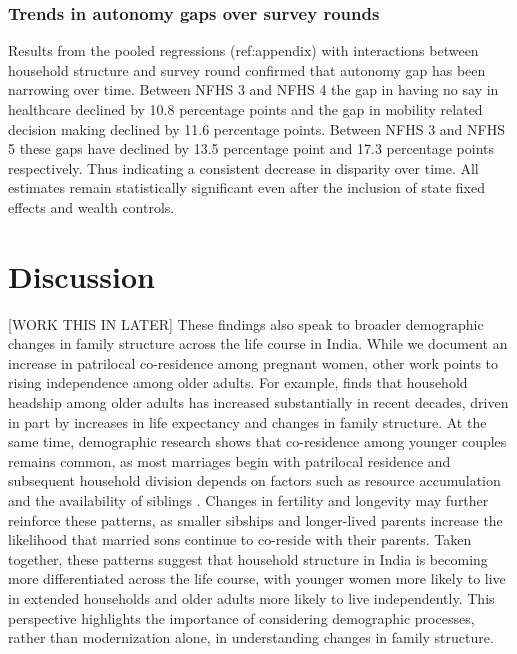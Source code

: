 \documentclass[12pt]{article}
\begin{document}
\subsubsection{Trends in autonomy gaps over survey rounds}

Results from the pooled regressions (ref:appendix) with interactions between household structure and survey round confirmed that autonomy gap has been narrowing over time. Between NFHS 3 and NFHS 4 the gap in having no say in healthcare declined by 10.8 percentage points and the gap in mobility related decision making declined by 11.6 percentage points. Between NFHS 3 and NFHS 5 these gaps have declined by 13.5 percentage point and 17.3 percentage points respectively. Thus indicating a consistent decrease in disparity over time. All estimates remain statistically significant even after the inclusion of state fixed effects and wealth controls. 
 

\section{Discussion}


[WORK THIS IN LATER] These findings also speak to broader demographic changes in family structure across the life course in India. While we document an increase in patrilocal co-residence among pregnant women, other work points to rising independence among older adults. For example, \cite{srivastava2022does} finds that household headship among older adults has increased substantially in recent decades, driven in part by increases in life expectancy and changes in family structure. At the same time, demographic research shows that co-residence among younger couples remains common, as most marriages begin with patrilocal residence and subsequent household division depends on factors such as resource accumulation and the availability of siblings \citep{breton2021modernisation}. Changes in fertility and longevity may further reinforce these patterns, as smaller sibships and longer-lived parents increase the likelihood that married sons continue to co-reside with their parents. Taken together, these patterns suggest that household structure in India is becoming more differentiated across the life course, with younger women more likely to live in extended households and older adults more likely to live independently. This perspective highlights the importance of considering demographic processes, rather than modernization alone, in understanding changes in family structure.
\end{document}
